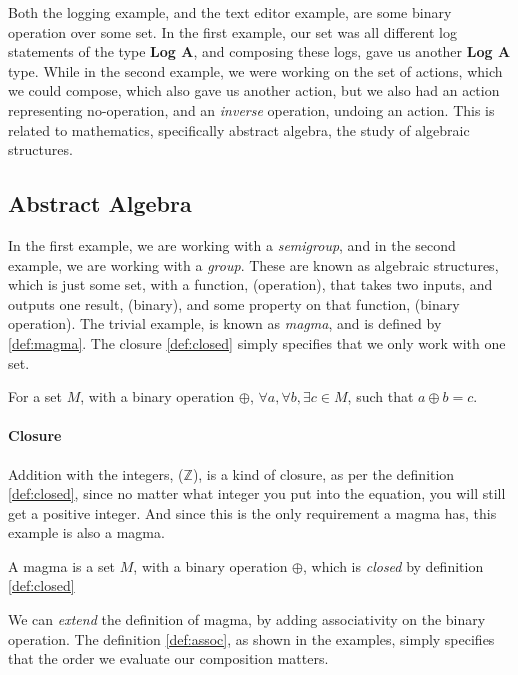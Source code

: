 Both the logging example, and the text editor example, are some binary operation
over some set. In the first example, our set was all different log statements of
the type \textbf{Log A}, and composing these logs, gave us another
\textbf{Log A} type. While in the second example, we were working on the set of
actions, which we could compose, which also gave us another action, but we also
had an action representing no-operation, and an \textit{inverse} operation,
undoing an action. This is related to mathematics, specifically abstract
algebra, the study of algebraic structures.

\subsection{Abstract Algebra}


In the first example, we are working with a \textit{semigroup}, and in the
second example, we are working with a \textit{group}. These are known as
algebraic structures, which is just some set, with a function, (operation), that
takes two inputs, and outputs one result, (binary), and some property on that
function, (binary operation). The trivial example, is known as \textit{magma},
and is defined by \ref{def:magma}. The closure \ref{def:closed} simply specifies
that we only work with one set.

\begin{definition}[Closure] \label{def:closed}
  For a set $M$, with a binary operation $\oplus$,
  $\forall a, \forall b, \exists c \in M$, such that
  $a \oplus b = c$.
\end{definition}

\paragraph{Closure} Addition with the integers, ($\mathbb{Z}$), is a kind of
closure, as per the definition \ref{def:closed}, since no matter what integer
you put into the equation, you will still get a positive integer. And since
this is the only requirement a magma has, this example is also a magma.

\begin{definition}[Magma] \label{def:magma}
  A magma is a set $M$, with a binary operation $\oplus$, which is
  \textit{closed} by definition \ref{def:closed}
\end{definition}

We can \textit{extend} the definition of magma, by adding associativity on the
binary operation. The definition \ref{def:assoc}, as shown in the examples,
simply specifies that the order we evaluate our composition matters.

